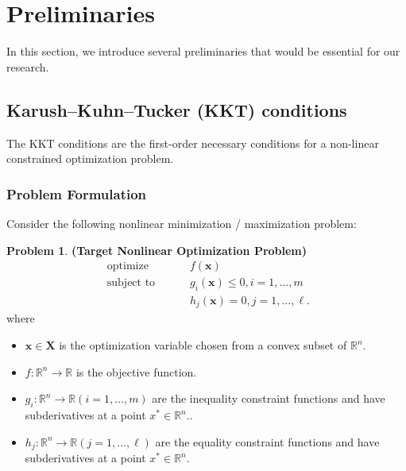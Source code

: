 \documentclass[13pt]{article}
\theoremstyle{definition}
\newtheorem{problem}[theorem]{Problem}
\theoremstyle{remark}
\begin{document}
\newpage
\section{Preliminaries}
In this section, we introduce several preliminaries that would be essential for our research.



\subsection{Karush–Kuhn–Tucker (KKT) conditions}\label{sec:Karush–Kuhn–Tucker (KKT) conditions}
{\color{C6} The KKT conditions are the first-order necessary conditions for a non-linear constrained optimization problem.}
\subsubsection{Problem Formulation}
Consider the following nonlinear minimization / maximization problem:
\begin{problem}
    \textbf{(Target Nonlinear Optimization Problem)} $$
\begin{aligned}
 \text { optimize } \qquad &f(\bm{x}) \\
 \text { subject to } \qquad &g_i(\bm{x}) \leq 0, i=1, \ldots, m\\
&h_j(\bm{x})=0, j=1, \ldots, \ell.
\end{aligned}
$$
where 
\begin{itemize}
    \item $\bm{x} \in \mathbf{X}$ is the optimization variable chosen from a convex subset of $\mathbb{R}^n$.
    \item $f: \mathbb{R}^n \rightarrow \mathbb{R}$ is the objective function.
    \item $g_i: \mathbb{R}^n \rightarrow \mathbb{R} (i=1, \ldots, m)$ are the inequality constraint functions and have subderivatives at a point $x^* \in \mathbb{R}^n$..
    \item $h_j: \mathbb{R}^n \rightarrow \mathbb{R} (j=1, \ldots, \ell)$ are the equality constraint functions and have subderivatives at a point $x^* \in \mathbb{R}^n$.
\end{itemize}
\end{problem}
\end{document}
